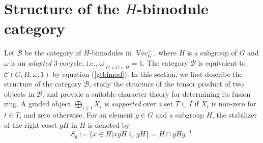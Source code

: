 \documentclass[11pt]{book}
\theoremstyle{Rem}
\theoremstyle{definition}
\numberwithin{equation}{section}
\newcommand\inv{^{-1}}
\newcommand\Vect{\operatorname{Vec}}
\newcommand\C{\mathcal C}
\newcommand\B{\mathcal B}
\begin{document}
\section{Structure of the $H$-bimodule category}\label{structureHbimod}
Let $\B $ be the category of $H$-bimodules in $\Vect^\omega_G$, where $H$ is a subgroup of $G$ and $\omega$ is an \textit{adapted} 3-cocycle, i.e., $\omega|_{G\times G\times H} = 1$. The category $\B$ is equivalent to $\C(G, H, \omega, 1)$ by equation (\ref{gtbimod}). In this section, we first describe the structure of the category $\B$, study the structure of the tensor product of two objects in $\B$, and provide a suitable character theory for determining its fusion ring. A graded object $\bigoplus_{i\in I} X_i$ is \textit{supported} over a set $T\subseteq I$ if $X_t$ is non-zero for $t\in T$, and zero otherwise. For an element $g\in G$ and a subgroup $H$, the stabilizer of the right coset $gH$ in $H$ is denoted by \begin{equation}
	S_g := \{x\in H | xgH \subseteq gH\} = H\cap gHg\inv.
\end{equation}
\end{document}
